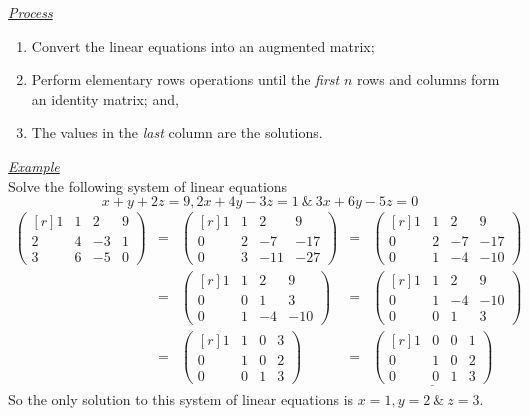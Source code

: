\documentclass[11pt,a4paper]{article}
\begin{document}
\underline{\textit{Process}}
\begin{enumerate}[label=\roman*)]
  \itemsep0em
  \item Convert the linear equations into an augmented matrix;
  \item Perform elementary rows operations until the \textit{first} $n$ rows and columns form an identity matrix; and,
  \item The values in the \textit{last} column are the solutions.
\end{enumerate}

\newpage\underline{\textit{Example}}\\
Solve the following system of linear equations
$$x+y+2z=9, 2x+4y-3z=1\ \&\ 3x+6y-5z=0$$
\[\begin{array}{ccccc}
  \begin{pmatrix*}[r] 1 & 1 & 2 & 9 \\ 2 & 4 & -3 & 1 \\ 3 & 6 & -5 & 0 \end{pmatrix*} &=& \begin{pmatrix*}[r] 1 & 1 & 2 & 9 \\ 0 & 2 & -7 & -17 \\ 0 & 3 & -11 & -27 \end{pmatrix*} &=& \begin{pmatrix*}[r] 1 & 1 & 2 & 9 \\ 0 & 2 & -7 & -17 \\ 0 & 1 & -4 & -10 \end{pmatrix*}\\
  &=& \begin{pmatrix*}[r] 1 & 1 & 2 & 9 \\ 0 & 0 & 1 & 3 \\ 0 & 1 & -4 & -10 \end{pmatrix*} &=& \begin{pmatrix*}[r] 1 & 1 & 2 & 9 \\ 0 & 1 & -4 & -10 \\ 0 & 0 & 1 & 3 \end{pmatrix*} \\
  &=& \begin{pmatrix*}[r] 1 & 1 & 0 & 3 \\ 0 & 1 & 0 & 2 \\ 0 & 0 & 1 & 3 \end{pmatrix*} &=& \underline{\begin{pmatrix*}[r] 1 & 0 & 0 & 1 \\ 0 & 1 & 0 & 2 \\ 0 & 0 & 1 & 3 \end{pmatrix*}}
\end{array}\]
So the only solution to this system of linear equations is $x=1,y=2\ \&\ z=3$.\\
\end{document}
